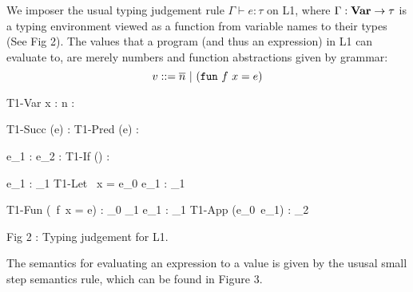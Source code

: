 We imposer the usual typing judgement rule $\Gamma \vdash e : \tau$ on L1,
where $\Gamma : \text{\bf Var} \rightarrow \tau$ is a typing environment viewed as a function from
variable names to their types (See Fig 2).
The values that a program (and thus an expression) in L1 can evaluate to,
are merely numbers and function abstractions given by grammar:
\[ v ::= \overline n \ |\  (\text{\tt fun}\ f\ x = e)\]

\newpage
{}
\begin{center}
                {T1-Var}  {\Gamma \vdash x : \tau}
  \quad {}    {\Gamma \vdash \overline n : }

                {T1-Succ} {\Gamma \vdash {}(e) : }
  \quad {}
                {T1-Pred} {\Gamma \vdash {}(e) : }

                          {\Gamma \vdash e_1 : \tau}
                          {\Gamma \vdash e_2 : \tau}
                {T1-If}  {\Gamma \vdash () : \tau}

                          { \vdash e_1 : \tau_1}
                {T1-Let}  {\Gamma \vdash {}\ x = e_0  e_1 : \tau_1}

                {T1-Fun}  {\Gamma \vdash (\ f\ x = e) : \tau_0 \TO \tau_1}
                          {\Gamma \vdash e_1 : \tau_1}
                {T1-App}  {\Gamma \vdash (e_0\ e_1) : \tau_2}

\vspace{.5cm}            Fig 2 : Typing judgement for L1.
\end{center}

The semantics for evaluating an expression to a value is given by the
ususal small step semantics rule, which can be found in Figure 3.

